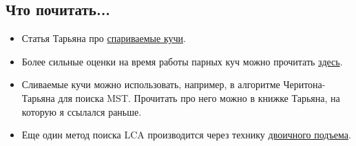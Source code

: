 \subsection{Что почитать...}

\begin{itemize}
  
  \item Статья Тарьяна про \href{http://www.lb.cs.cmu.edu/afs/cs.cmu.edu/user/sleator/www/papers/pairing-heaps.pdf}{спариваемые кучи}.

  \item Более сильные оценки на время работы парных куч можно прочитать \href{http://web.eecs.umich.edu/~pettie/papers/focs05.pdf}{здесь}.

  \item Сливаемые кучи можно использовать, например, в алгоритме Черитона-Тарьяна для поиска MST. Прочитать про него можно в книжке Тарьяна, на которую я ссылался раньше.

  \item Еще один метод поиска LCA производится через технику \href{http://neerc.ifmo.ru/wiki/index.php?title=%D0%9C%D0%B5%D1%82%D0%BE%D0%B4_%D0%B4%D0%B2%D0%BE%D0%B8%D1%87%D0%BD%D0%BE%D0%B3%D0%BE_%D0%BF%D0%BE%D0%B4%D1%8A%D0%B5%D0%BC%D0%B0}{двоичного подъема}.

\end{itemize}


\clearpage
